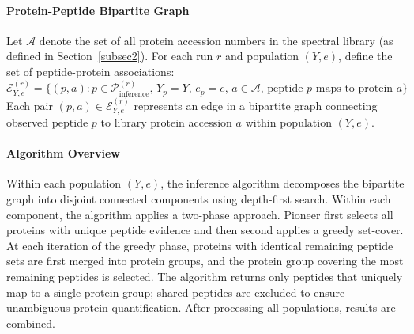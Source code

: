 \documentclass[pdflatex,sn-nature]{sn-jnl}
\begin{document}
\paragraph{Protein-Peptide Bipartite Graph}\label{para:protein-peptide-bipartite-graph} Let $\mathcal{A}$ denote the set of all protein accession numbers in the spectral library (as defined in Section~\ref{subsec2}). For each run $r$ and population $(Y, e)$, define the set of peptide-protein associations:
\begin{equation}
\mathcal{E}^{(r)}_{Y,e} = \{(p, a) : p \in \mathcal{P}_{\text{inference}}^{(r)}, \, Y_p = Y, \, e_p = e, \, a \in \mathcal{A}, \, \text{peptide } p \text{ maps to protein } a\}
\end{equation}
Each pair $(p, a) \in \mathcal{E}^{(r)}_{Y,e}$ represents an edge in a bipartite graph connecting observed peptide $p$ to library protein accession $a$ within population $(Y, e)$.

\paragraph{Algorithm Overview}\label{para:algorithm-overview} Within each population $(Y, e)$, the inference algorithm decomposes the bipartite graph into disjoint connected components using depth-first search. Within each component, the algorithm applies a two-phase approach. Pioneer first selects all proteins with unique peptide evidence and then second applies a greedy set-cover. At each iteration of the greedy phase, proteins with identical remaining peptide sets are first merged into protein groups, and the protein group covering the most remaining peptides is selected. The algorithm returns only peptides that uniquely map to a single protein group; shared peptides are excluded to ensure unambiguous protein quantification. After processing all populations, results are combined.
\end{document}
